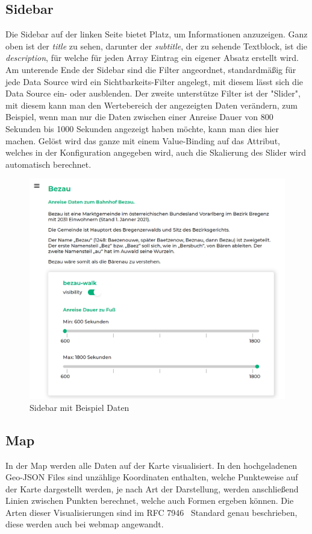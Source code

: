 \subsection{Sidebar}
Die Sidebar auf der linken Seite bietet Platz, um Informationen anzuzeigen.
Ganz oben ist der \emph{title} zu sehen, darunter der \emph{subtitle}, der zu sehende Textblock, ist die \emph{description},
für welche für jeden Array Eintrag ein eigener Absatz erstellt wird.
Am unterende Ende der Sidebar sind die Filter angeordnet, standardmäßig für jede Data Source wird ein Sichtbarkeits-Filter angelegt,
mit diesem lässt sich die Data Source ein- oder ausblenden.
Der zweite unterstütze Filter ist der "Slider", mit diesem kann man den Wertebereich der angezeigten Daten verändern,
zum Beispiel, wenn man nur die Daten zwischen einer Anreise Dauer von 800 Sekunden bis 1000 Sekunden angezeigt haben möchte, kann man dies hier machen.
Gelöst wird das ganze mit einem Value-Binding auf das Attribut, welches in der Konfiguration angegeben wird, auch
die Skalierung des Slider wird automatisch berechnet.

\begin{figure}[hbt!]
    \centering
    \includegraphics[scale=.7]{pics/sidebar}
    \caption{Sidebar mit Beispiel Daten}
    \label{fig:sidebar}
\end{figure}

\subsection{Map}
In der Map werden alle Daten auf der Karte visualisiert.
In den hochgeladenen Geo-JSON Files sind unzählige Koordinaten enthalten, welche Punkteweise auf der Karte dargestellt werden,
je nach Art der Darstellung, werden anschließend Linien zwischen Punkten berechnet, welche auch Formen ergeben können.
Die Arten dieser Visualisierungen sind im RFC 7946~\cite{rfc7946} Standard genau beschrieben, diese werden auch bei webmap angewandt.

